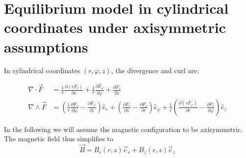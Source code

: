 \chapter{Equilibrium model in cylindrical coordinates under axisymmetric assumptions}

In cylindrical coordinates $(r, \varphi, z)$, the divergence and curl are:

\begin{align}
    \nabla \cdot \vec{F} &= \frac{1}{r}\frac{\partial (r F_r)}{\partial r} + \frac{1}{r}\frac{\partial F_\varphi}{\partial \varphi} + \frac{\partial F_z}{\partial z} \\
    \nabla \wedge \vec{F} &= \left(\frac{1}{r}\frac{\partial F_z}{\partial \varphi} - \frac{\partial F_\varphi}{\partial z}\right)\hat{e}_r
    + \left(\frac{\partial F_r}{\partial z} - \frac{\partial F_z}{\partial r}\right)\hat{e}_\varphi
    + \frac{1}{r}\left(\frac{\partial (r F_\varphi)}{\partial r} - \frac{\partial F_r}{\partial \varphi}\right)\hat{e}_z
\end{align}

In the following we will assume the magnetic configuration to be axisymmetric.
The magnetic field thus simplifies to
\[
\vec{B} = B_r (r,z) \vec{e}_r + B_z(r,z) \vec{e}_z
\]
